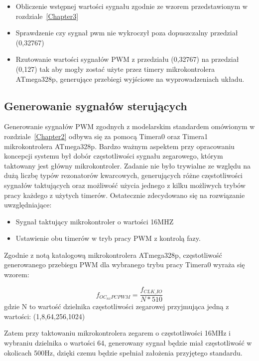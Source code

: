 \begin{itemize}
	\item Obliczenie wstępnej wartości sygnału zgodnie ze wzorem przedstawionym w rozdziale~\ref{Chapter3}
	\item Sprawdzenie czy sygnał pwm nie wykroczył poza dopuszczalny przedział (0,32767)
	\item Rzutowanie wartości sygnałów PWM z przedziału (0,32767) na przedział (0,127) tak aby mogły zostać użyte przez timery mikrokontrolera ATmega328p, generujące przebiegi wyjściowe na wyprowadzeniach układu. 
\end{itemize}


\subsection{Generowanie sygnałów sterujących}

Generowanie sygnałów PWM zgodnych z modelarskim standardem omówionym w rozdziale~\ref{Chapter2} odbywa się za pomocą Timera0 oraz Timera1 mikrokontrolera ATmega328p. Bardzo ważnym aspektem przy opracowaniu koncepcji systemu był dobór częstotliwości sygnału zegarowego, którym taktowany jest główny mikrokontroler. Zadanie nie było trywialne ze względu na dużą liczbę typów rezonatorów kwarcowych, generujących różne częstotliwości sygnałów taktujących oraz możliwość użycia jednego z kilku możliwych trybów pracy każdego z użytych timerów. Ostatecznie zdecydowano się na rozwiązanie uwzględniające:
\begin{itemize}
	\item Sygnał taktujący mikrokontroler o wartości 16MHZ
	\item Ustawienie obu timerów w tryb pracy PWM z kontrolą fazy.
\end{itemize}

Zgodnie z notą katalogową mikrokontrolera ATmega328p, częstotliwość generowanego przebiegu PWM dla wybranego trybu pracy Timera0 wyraża się wzorem:

\begin{equation}
	f_{OC_{nx}PCPWM} = \frac{f_{CLK\_IO}}{N * 510}
\end{equation}
gdzie N to wartość dzielnika częstotliwości zegarowej przyjmująca jedną z wartości: (1,8,64,256,1024)
 
Zatem przy taktowaniu mikrokontrolera zegarem o częstotliwości 16MHz i wybraniu dzielnika o wartości 64, generowany sygnał będzie miał częstotliwość w okolicach 500Hz, dzięki czemu będzie spełniał założenia przyjętego standardu. 

